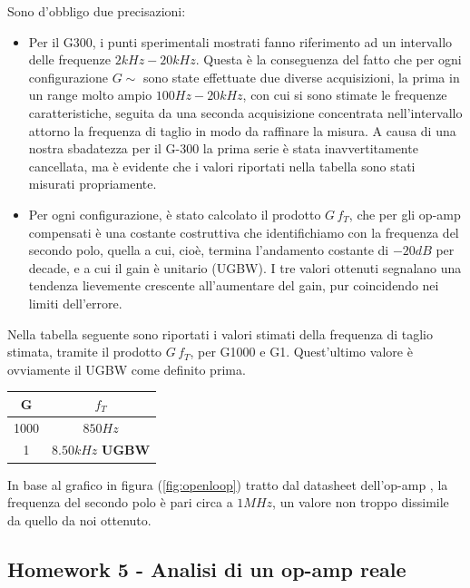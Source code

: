 \documentclass[journal, a4paper]{IEEEtran}
\begin{document}
Sono d'obbligo due precisazioni:

\begin{itemize}
\item Per il G300, i punti sperimentali mostrati fanno riferimento ad un intervallo delle frequenze $2 \si{kHz} - 20 \si{kHz}$. Questa è la conseguenza del fatto che per ogni configurazione $G\sim$ sono state effettuate due diverse acquisizioni, la prima in un range molto ampio $100 \si{Hz} - 20 \si{kHz}$, con cui si sono stimate le frequenze caratteristiche, seguita da una seconda acquisizione concentrata nell'intervallo attorno la frequenza di taglio in modo da raffinare la misura. A causa di una nostra sbadatezza per il G-300 la prima serie è stata inavvertitamente cancellata, ma è evidente che i valori riportati nella tabella sono stati misurati propriamente.

\item Per ogni configurazione, è stato calcolato il prodotto $ G \, f_T$, che per gli op-amp compensati è una costante costruttiva che identifichiamo con la frequenza del secondo polo, quella a cui, cioè, termina l'andamento costante di $-20 \si{dB} $ per decade, e a cui il gain è unitario (\textsc{UGBW}). I tre valori ottenuti segnalano una tendenza lievemente crescente all'aumentare del gain, pur coincidendo nei limiti dell'errore.
\end{itemize}

Nella tabella seguente sono riportati i valori stimati della frequenza di taglio stimata, tramite il prodotto  $ G \, f_T$, per G1000 e G1. Quest'ultimo valore è ovviamente il \textsc{UGBW} come definito prima. 

{
\centering
\begin{tabular}{|c|c|}
\hline G & $f_{T}$ \\ 
\hline 1000 &  $850 \si{Hz}$\\ 
\hline 1  &   $8.50 \si{kHz}$ \textbf{\textsc{UGBW}}\\ 
\hline 
\end{tabular}

} 

In base al grafico in figura (\ref{fig:openloop}) tratto dal datasheet dell'op-amp %
, la frequenza del secondo polo è pari circa a $1 \si{MHz}$, un valore non troppo dissimile da quello da noi ottenuto.



\subsection{Homework 5 - Analisi di un op-amp reale}
\end{document}
